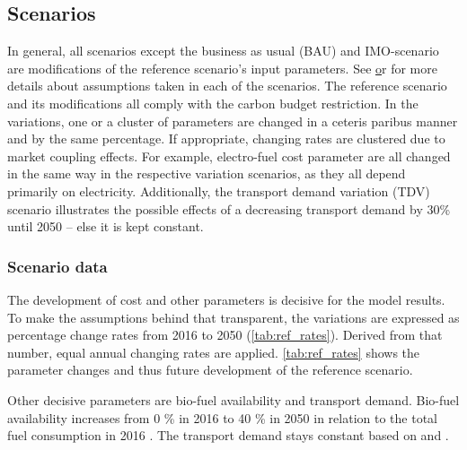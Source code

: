 \documentclass[article]{elsarticle}
\begin{document}
\subsection{Scenarios}
\label{subsec:Sce}
In general, all scenarios except the business as usual (BAU) and IMO-scenario are modifications of the reference scenario's input parameters. See \href{app:tables} or \cite{BenBrahim2018} for more details about assumptions taken in each of the scenarios. The reference scenario and its modifications all comply with the carbon budget restriction. In the variations, one or a cluster of parameters are changed in a ceteris paribus manner and by the same percentage. If appropriate, changing rates are clustered due to market coupling effects. For example, electro-fuel cost parameter are all changed in the same way in the respective variation scenarios, as they all depend primarily on electricity. Additionally, the transport demand variation (TDV) scenario illustrates the possible effects of a decreasing transport demand by 30\% until 2050 -- else it is kept constant.

\subsubsection{Scenario data}
The development of cost and other parameters is decisive for the model results. To make the assumptions behind that transparent, the variations are expressed as percentage change rates from 2016 to 2050 (\autoref{tab:ref_rates}). Derived from that number, equal annual changing rates are applied. \autoref{tab:ref_rates} shows the parameter changes and thus future development of the reference scenario.

Other decisive parameters are bio-fuel availability and transport demand. Bio-fuel availability increases from 0 \% in 2016 to 40 \% in 2050 in relation to the total fuel consumption in 2016 \cite{DEA2016}. The transport demand stays constant based on \cite[p.~18]{ITF2018} and \cite[p.~19]{Rex2017}.
\end{document}

